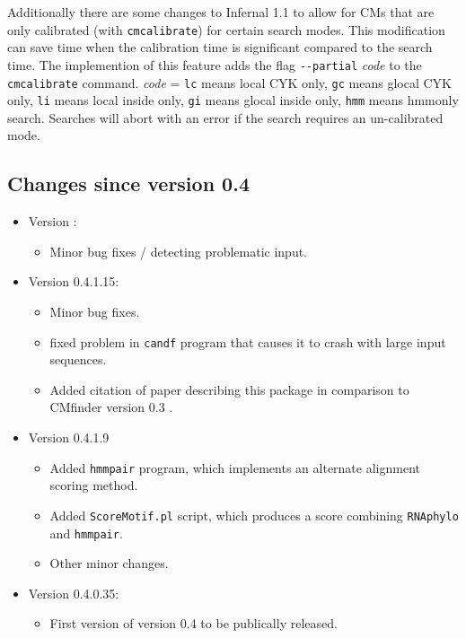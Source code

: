\documentclass[letterpaper,12pt]{report}
\begin{document}
Additionally there are some changes to Infernal 1.1 to allow for CMs that are only calibrated (with {\tt cmcalibrate}) for certain search modes.  This modification can save time when the calibration time is significant compared to the search time.  The implemention of this feature adds the flag {\tt -{}-partial} {\it code} to the {\tt cmcalibrate} command.  {\it code} = {\tt lc} means local CYK only, {\tt gc} means glocal CYK only, {\tt li} means local inside only, {\tt gi} means glocal inside only, {\tt hmm} means hmmonly search.  Searches will abort with an error if the search requires an un-calibrated mode.

\subsection{Changes since version 0.4}

\begin{itemize}
\item Version \myversion{}:
\begin{itemize}
\item Minor bug fixes / detecting problematic input.
\end{itemize}
\item Version 0.4.1.15:
\begin{itemize}
\item Minor bug fixes.
\item fixed problem in {\tt candf} program that causes it to crash with large input sequences.
  \item Added citation of paper describing this package in comparison to CMfinder version 0.3 \cite{MotifsTwoTwoFour}.
\end{itemize}
\item Version 0.4.1.9
\begin{itemize}
\item Added {\tt hmmpair} program, which implements an alternate alignment scoring method.
\item Added {\tt ScoreMotif.pl} script, which produces a score combining {\tt RNAphylo} and {\tt hmmpair}.
\item Other minor changes.
\end{itemize}
\item Version 0.4.0.35:
\begin{itemize}
\item First version of version 0.4 to be publically released.
\end{itemize}
\end{itemize}
\end{document}
